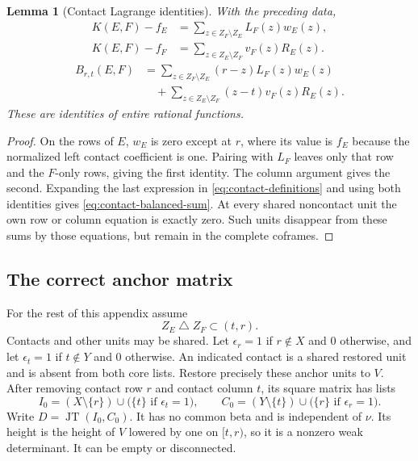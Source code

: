 \documentclass[11pt,a4paper]{amsart}
\numberwithin{equation}{section}
\theoremstyle{plain}
\newtheorem{lemma}[theorem]{Lemma}
\theoremstyle{definition}
\newcommand{\JT}{\operatorname{JT}}
\begin{document}
\begin{lemma}[Contact Lagrange identities]\label{lem:contact-lagrange}
With the preceding data,
\[
 \begin{aligned}
 K(E,F)-f_E
   &=\sum_{z\in Z_F\setminus Z_E}L_F(z)w_E(z),\\
 K(E,F)-f_F
   &=\sum_{z\in Z_E\setminus Z_F}v_F(z)R_E(z).
 \end{aligned}
\]
\begin{equation}\label{eq:contact-balanced-sum}
 \begin{aligned}
 B_{r,t}(E,F)
   & =\sum_{z\in Z_F\setminus Z_E}(r-z)L_F(z)w_E(z)\\
   &\quad+\sum_{z\in Z_E\setminus Z_F}(z-t)v_F(z)R_E(z).
 \end{aligned}
\end{equation}
These are identities of entire rational functions.
\end{lemma}
\begin{proof}
On the rows of \(E\), \(w_E\) is zero except at \(r\), where its value is \(f_E\)
because the normalized left contact coefficient is one.  Pairing with
\(L_F\) leaves only that row and the \(F\)-only rows, giving the first identity.
The column argument gives the second.  Expanding the last expression in
\eqref{eq:contact-definitions} and using both identities gives
\eqref{eq:contact-balanced-sum}.  At every shared noncontact unit the own
row or column equation is exactly zero.  Such units disappear from these
sums by those equations, but remain in the complete coframes.
\end{proof}

\subsection{The correct anchor matrix}

For the rest of this appendix assume
\begin{equation}\label{eq:contact-interior-domain}
 Z_E\mathbin\triangle Z_F\subset(t,r).
\end{equation}
Contacts and other units may be shared.  Let \(\epsilon_r=1\) if \(r\notin X\)
and \(0\) otherwise, and let \(\epsilon_t=1\) if \(t\notin Y\) and \(0\)
otherwise.  An indicated contact is a shared restored unit and is absent
from both core lists.  Restore precisely these anchor units to \(V\).
After removing contact row \(r\) and contact column \(t\), its square matrix
has lists
\begin{equation}\label{eq:contact-anchor-lists}
 I_0=(X\setminus\{r\})\cup\bigl(\{t\}\text{ if }\epsilon_t=1\bigr),
 \qquad
 C_0=(Y\setminus\{t\})\cup\bigl(\{r\}\text{ if }\epsilon_r=1\bigr).
\end{equation}
Write \(D=\JT(I_0,C_0)\).  It has no common beta and is independent of \(\nu\).
Its height is the height of \(V\) lowered by one on \([t,r)\), so it is a
nonzero weak determinant.  It can be empty or disconnected.
\end{document}
